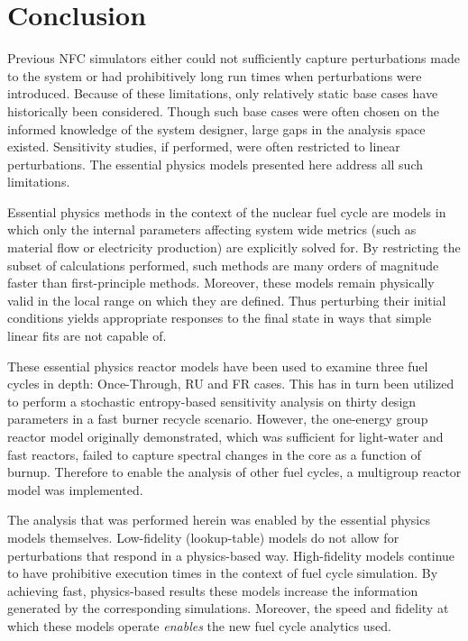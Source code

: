\chapter{Conclusion}
\label{diss_conclusion}
Previous NFC simulators either could not sufficiently capture perturbations made to the system
or had prohibitively long run times when perturbations were introduced.  Because of these 
limitations, only relatively static base cases have historically been considered.  
Though such base cases were often chosen on the informed knowledge of the system designer, 
large gaps in the analysis space existed.  Sensitivity studies, if performed, were often restricted to
linear perturbations.  The essential physics models presented here address all such 
limitations.

Essential physics methods in the context of the nuclear fuel cycle are models 
in which only the internal parameters affecting system wide metrics (such as material flow
or electricity production) are explicitly solved for.  By restricting the subset of 
calculations performed, such methods are many orders of magnitude faster than first-principle 
methods.  Moreover, these models remain physically valid in the local range on which they are defined.
Thus perturbing their initial conditions yields appropriate responses to the final state
in ways that simple linear fits are not capable of.

These essential physics reactor models have been used to examine three fuel cycles 
in depth: Once-Through, RU and FR cases.  This has in turn been utilized to perform 
a stochastic entropy-based sensitivity analysis on thirty design parameters in a fast
burner recycle scenario.  However, the one-energy group reactor model originally demonstrated, 
which was sufficient for light-water and fast reactors,  failed to capture 
spectral changes in the core as a function of burnup.
Therefore to enable the analysis of other fuel cycles, a multigroup reactor model was implemented.  

The analysis that was performed herein was enabled by the essential physics models themselves.
Low-fidelity (lookup-table) models do not allow for perturbations that respond 
in a physics-based way.  High-fidelity models continue to have prohibitive execution times in the 
context of fuel cycle simulation.  By achieving fast, physics-based results these models increase 
the information generated by the corresponding simulations.
Moreover, the speed and fidelity at which these models operate \emph{enables} the 
new fuel cycle analytics used.  


